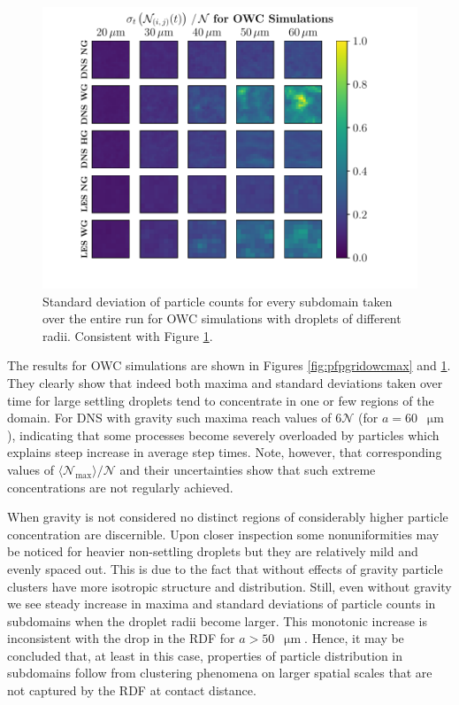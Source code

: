 \documentclass{pracamgren}
\begin{document}
\begin{figure}[!ht]
\centering
\includegraphics[width=13.5cm]{figures/3-19_pfpgridowcstd.pdf}
\caption{
Standard deviation of particle counts for every subdomain taken over the entire run for OWC simulations with droplets of different radii.
Consistent with Figure \ref{fig:pfpgridowcstd}.
}
\label{fig:pfpgridowcstd}
\end{figure}

The results for OWC simulations are shown in Figures \ref{fig:pfpgridowcmax} and \ref{fig:pfpgridowcstd}.
They clearly show that indeed both maxima and standard deviations taken over time for large settling droplets tend to concentrate in one or few regions of the domain.
For DNS with gravity such maxima reach values of $6 \mathcal{N}$ (for ${a = 60}$~$\upmu\text{m}$), indicating that some processes become severely overloaded by particles which explains steep increase in average step times.
Note, however, that corresponding values of $\langle \mathcal{N}_{\max} \rangle / \mathcal{N}$ and their uncertainties show that such extreme concentrations are not regularly achieved.

When gravity is not considered no distinct regions of considerably higher particle concentration are discernible.
Upon closer inspection some nonuniformities may be noticed for heavier non-settling droplets but they are relatively mild and evenly spaced out.
This is due to the fact that without effects of gravity particle clusters have more isotropic structure and distribution.
Still, even without gravity we see steady increase in maxima and standard deviations of particle counts in subdomains when the droplet radii become larger.
This monotonic increase is inconsistent with the drop in the RDF for ${a > 50}$~$\upmu\text{m}$.
Hence, it may be concluded that, at least in this case, properties of particle distribution in subdomains follow from clustering phenomena on larger spatial scales that are not captured by the RDF at contact distance. 
\end{document}
